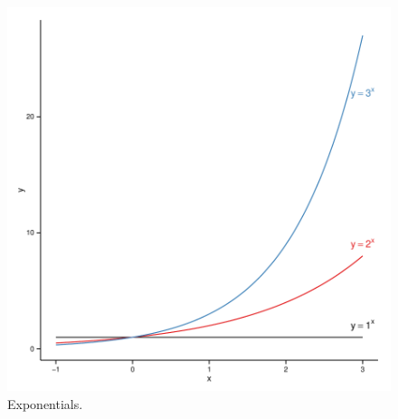 \begin{knitrout}
\color{fgcolor}\begin{figure}[]

\includegraphics[width=\linewidth]{images/math-fun_expgrowth} \caption{Exponentials.\label{fig:fun_expgrowth}}
\end{figure}


\end{knitrout}


